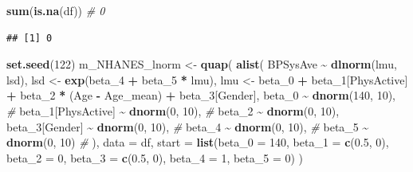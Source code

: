 \documentclass[
]{book}
\newenvironment{Shaded}{\begin{snugshade}}{\end{snugshade}}
\newcommand{\AttributeTok}[1]{\textcolor[rgb]{0.13,0.29,0.53}{#1}}
\newcommand{\CommentTok}[1]{\textcolor[rgb]{0.56,0.35,0.01}{\textit{#1}}}
\newcommand{\DecValTok}[1]{\textcolor[rgb]{0.00,0.00,0.81}{#1}}
\newcommand{\FloatTok}[1]{\textcolor[rgb]{0.00,0.00,0.81}{#1}}
\newcommand{\FunctionTok}[1]{\textcolor[rgb]{0.13,0.29,0.53}{\textbf{#1}}}
\newcommand{\NormalTok}[1]{#1}
\newcommand{\OtherTok}[1]{\textcolor[rgb]{0.56,0.35,0.01}{#1}}
\newcommand{\SpecialCharTok}[1]{\textcolor[rgb]{0.81,0.36,0.00}{\textbf{#1}}}
\begin{document}
\begin{Shaded}
\begin{Highlighting}[]
\FunctionTok{sum}\NormalTok{(}\FunctionTok{is.na}\NormalTok{(df)) }\CommentTok{\# 0}
\end{Highlighting}
\end{Shaded}

\begin{verbatim}
## [1] 0
\end{verbatim}

\begin{Shaded}
\begin{Highlighting}[]
\FunctionTok{set.seed}\NormalTok{(}\DecValTok{122}\NormalTok{)}
\NormalTok{m\_NHANES\_lnorm }\OtherTok{\textless{}{-}} \FunctionTok{quap}\NormalTok{(}
  \FunctionTok{alist}\NormalTok{(}
\NormalTok{    BPSysAve }\SpecialCharTok{\textasciitilde{}} \FunctionTok{dlnorm}\NormalTok{(lmu, lsd), }
\NormalTok{    lsd }\OtherTok{\textless{}{-}} \FunctionTok{exp}\NormalTok{(beta\_4 }\SpecialCharTok{+}\NormalTok{ beta\_5 }\SpecialCharTok{*}\NormalTok{ lmu),}
\NormalTok{    lmu }\OtherTok{\textless{}{-}}\NormalTok{ beta\_0 }\SpecialCharTok{+}\NormalTok{ beta\_1[PhysActive] }\SpecialCharTok{+}\NormalTok{ beta\_2 }\SpecialCharTok{*}\NormalTok{ (Age }\SpecialCharTok{{-}}\NormalTok{ Age\_mean) }\SpecialCharTok{+}\NormalTok{ beta\_3[Gender],}
\NormalTok{    beta\_0 }\SpecialCharTok{\textasciitilde{}} \FunctionTok{dnorm}\NormalTok{(}\DecValTok{140}\NormalTok{, }\DecValTok{10}\NormalTok{),  }\CommentTok{\# }
\NormalTok{    beta\_1[PhysActive] }\SpecialCharTok{\textasciitilde{}} \FunctionTok{dnorm}\NormalTok{(}\DecValTok{0}\NormalTok{, }\DecValTok{10}\NormalTok{),  }\CommentTok{\# }
\NormalTok{    beta\_2 }\SpecialCharTok{\textasciitilde{}} \FunctionTok{dnorm}\NormalTok{(}\DecValTok{0}\NormalTok{, }\DecValTok{10}\NormalTok{),}
\NormalTok{    beta\_3[Gender] }\SpecialCharTok{\textasciitilde{}} \FunctionTok{dnorm}\NormalTok{(}\DecValTok{0}\NormalTok{, }\DecValTok{10}\NormalTok{),  }\CommentTok{\# }
\NormalTok{    beta\_4 }\SpecialCharTok{\textasciitilde{}} \FunctionTok{dnorm}\NormalTok{(}\DecValTok{0}\NormalTok{, }\DecValTok{10}\NormalTok{),  }\CommentTok{\# }
\NormalTok{    beta\_5 }\SpecialCharTok{\textasciitilde{}} \FunctionTok{dnorm}\NormalTok{(}\DecValTok{0}\NormalTok{, }\DecValTok{10}\NormalTok{)  }\CommentTok{\#}
\NormalTok{  ),}
  \AttributeTok{data =}\NormalTok{ df,}
  \AttributeTok{start =} \FunctionTok{list}\NormalTok{(}\AttributeTok{beta\_0 =} \DecValTok{140}\NormalTok{, }\AttributeTok{beta\_1 =} \FunctionTok{c}\NormalTok{(}\FloatTok{0.5}\NormalTok{, }\DecValTok{0}\NormalTok{), }\AttributeTok{beta\_2 =} \DecValTok{0}\NormalTok{, }\AttributeTok{beta\_3 =} \FunctionTok{c}\NormalTok{(}\FloatTok{0.5}\NormalTok{, }\DecValTok{0}\NormalTok{), }\AttributeTok{beta\_4 =} \DecValTok{1}\NormalTok{, }\AttributeTok{beta\_5 =} \DecValTok{0}\NormalTok{)}
\NormalTok{)}


\end{Highlighting}
\end{Shaded}
\end{document}
